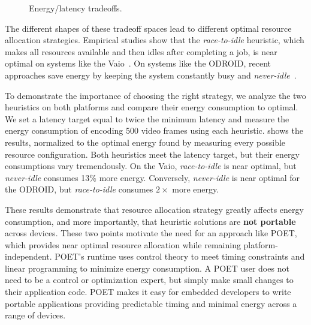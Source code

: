 \begin{figure}[t]
  \centering
  \caption{Energy/latency tradeoffs.}
  \label{fig:poet-x264-motivation}
\end{figure}

The different shapes of these tradeoff spaces lead to different optimal resource allocation strategies.
Empirical studies show that the \emph{race-to-idle} heuristic, which makes all resources available and then idles after completing a job, is near optimal on systems like the Vaio~\cite{PowerSlope,Hoelzle2009,google,Imes2014,HotPower}.
On systems like the ODROID, recent approaches save energy by keeping the system constantly busy and \emph{never-idle}~\cite{Carroll13,LeSueur11,Lin2010,Imes2014,HotPower}.

To demonstrate the importance of choosing the right strategy, we analyze the two heuristics on both platforms and compare their energy consumption to optimal.
We set a latency target equal to twice the minimum latency and measure the energy consumption of encoding 500 video frames using each heuristic.
 shows the results, normalized to the optimal energy found by measuring every possible resource configuration.
Both heuristics meet the latency target, but their energy consumptions vary tremendously.
On the Vaio, \emph{race-to-idle} is near optimal, but \emph{never-idle} consumes 13\% more energy.
Conversely, \emph{never-idle} is near optimal for the ODROID, but \emph{race-to-idle} consumes $2 \times$ more energy.

These results demonstrate that resource allocation strategy greatly affects energy consumption, and more importantly, that heuristic solutions are \textbf{not portable} across devices.
These two points motivate the need for an approach like POET, which provides near optimal resource allocation while remaining platform-independent.
POET's runtime uses control theory to meet timing constraints and linear programming to minimize energy consumption.
A POET user does not need to be a control or optimization expert, but simply make small changes to their application code.
POET makes it easy for embedded developers to write portable applications providing predictable timing and minimal energy across a range of devices.
